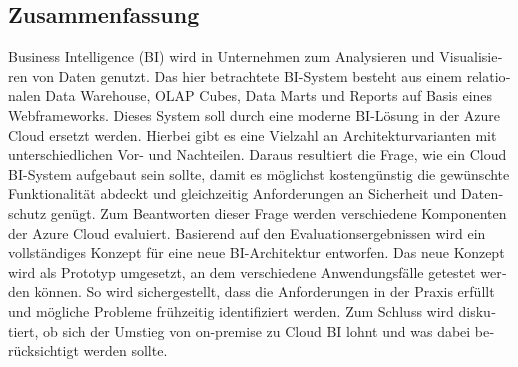 \begin{otherlanguage}{ngerman}
	\chapter*{Zusammenfassung}
Business Intelligence (BI) wird in Unternehmen zum Analysieren und Visualisieren von Daten genutzt. Das hier betrachtete BI-System besteht aus einem relationalen Data Warehouse, OLAP Cubes, Data Marts und Reports auf Basis eines Webframeworks. Dieses System soll durch eine moderne BI-Lösung in der Azure Cloud ersetzt werden. Hierbei gibt es eine Vielzahl an Architekturvarianten mit unterschiedlichen Vor- und Nachteilen. Daraus resultiert die Frage, wie ein Cloud BI-System aufgebaut sein sollte, damit es möglichst kostengünstig die gewünschte Funktionalität abdeckt und gleichzeitig Anforderungen an Sicherheit und Datenschutz genügt. Zum Beantworten dieser Frage werden verschiedene Komponenten der Azure Cloud evaluiert. Basierend auf den Evaluationsergebnissen wird ein vollständiges Konzept für eine neue BI-Architektur entworfen. Das neue Konzept wird als Prototyp umgesetzt, an dem verschiedene Anwendungsfälle getestet werden können. So wird sichergestellt, dass die Anforderungen in der Praxis erfüllt und mögliche Probleme frühzeitig identifiziert werden. Zum Schluss wird diskutiert, ob sich der Umstieg von on-premise zu Cloud BI lohnt und was dabei berücksichtigt werden sollte.
\end{otherlanguage}